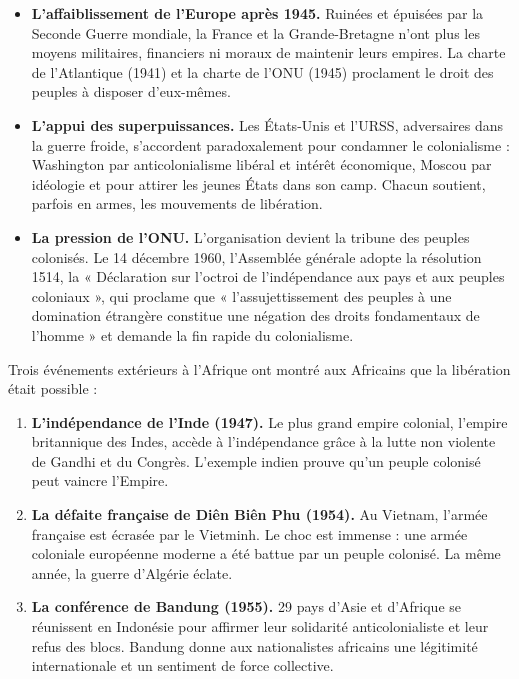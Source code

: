 \documentclass[11pt]{article}
\newcommand{\cle}[1]{{\popxbold\color{popdark}#1}}
\newcounter{popsec}
\newcounter{popsub}
\newcommand{\courssub}[1]{%
  \stepcounter{popsub}%
  \par\vspace{9pt}\noindent{\popxbold\fontsize{11.5}{13}\selectfont\color{popink}{\color{poporange}\thepopsec.\thepopsub}\hspace{6pt}#1}\par\nopagebreak\vspace{4pt}
}
\begin{document}
\begin{itemize}
\item \textbf{L'affaiblissement de l'Europe après 1945.} Ruinées et épuisées par la Seconde Guerre mondiale, la France et la Grande-Bretagne n'ont plus les moyens militaires, financiers ni moraux de maintenir leurs empires. La charte de l'Atlantique (1941) et la charte de l'ONU (1945) proclament le droit des peuples à disposer d'eux-mêmes.
\item \textbf{L'appui des superpuissances.} Les États-Unis et l'URSS, adversaires dans la guerre froide, s'accordent paradoxalement pour condamner le colonialisme : Washington par anticolonialisme libéral et intérêt économique, Moscou par idéologie et pour attirer les jeunes États dans son camp. Chacun soutient, parfois en armes, les mouvements de libération.
\item \textbf{La pression de l'ONU.} L'organisation devient la tribune des peuples colonisés. Le 14 décembre 1960, l'Assemblée générale adopte la \cle{résolution 1514}, la « Déclaration sur l'octroi de l'indépendance aux pays et aux peuples coloniaux », qui proclame que « l'assujettissement des peuples à une domination étrangère constitue une négation des droits fondamentaux de l'homme » et demande la fin rapide du colonialisme.
\end{itemize}

\courssub{Les exemples déclencheurs}

Trois événements extérieurs à l'Afrique ont montré aux Africains que la libération était possible :

\begin{enumerate}
\item \textbf{L'indépendance de l'Inde (1947).} Le plus grand empire colonial, l'empire britannique des Indes, accède à l'indépendance grâce à la lutte non violente de Gandhi et du Congrès. L'exemple indien prouve qu'un peuple colonisé peut vaincre l'Empire.
\item \textbf{La défaite française de Diên Biên Phu (1954).} Au Vietnam, l'armée française est écrasée par le Vietminh. Le choc est immense : une armée coloniale européenne moderne a été battue par un peuple colonisé. La même année, la guerre d'Algérie éclate.
\item \textbf{La conférence de Bandung (1955).} 29 pays d'Asie et d'Afrique se réunissent en Indonésie pour affirmer leur solidarité anticolonialiste et leur refus des blocs. Bandung donne aux nationalistes africains une légitimité internationale et un sentiment de force collective.
\end{enumerate}
\end{document}
